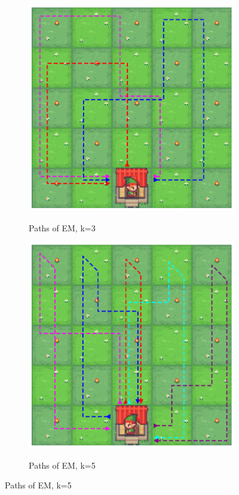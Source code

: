 \documentclass[letterpaper]{article} %
\begin{document}
\begin{figure}[t]
\begin{center}
    \begin{subfigure}{0.5\linewidth}
        \centering
        \caption{Paths of EM, k=3}
        \includegraphics[width=\linewidth]{pics/paths/k=3.png}
        \label{fig:results_resource_k=3}
    \end{subfigure}%
    \hfill%
    \begin{subfigure}{0.5\linewidth}
        \centering
        \caption{Paths of EM, k=5}
        \includegraphics[width=\linewidth]{pics/paths/k=5.png}
        \label{fig:results_resource_k=5}
    \end{subfigure}


\end{center}
\end{figure}
\end{document}
